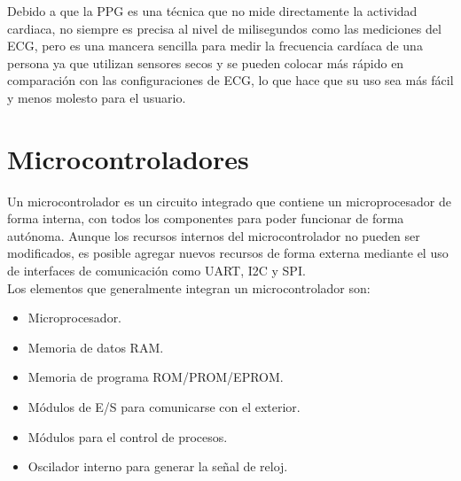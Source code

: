 			Debido a que la PPG es una técnica que no mide directamente la actividad cardiaca, no siempre es precisa al nivel de milisegundos como las mediciones del ECG, pero es una mancera sencilla para medir la frecuencia cardíaca de una persona ya que utilizan sensores secos y se pueden colocar más rápido en comparación con las configuraciones de ECG, lo que hace que su uso sea más fácil y menos molesto para el usuario. \cite{imotionsECG}
		
	\section{Microcontroladores}
	Un microcontrolador es  un  circuito  integrado  que  contiene  un  microprocesador  de  forma  interna,  con  todos  los  componentes  para  poder  funcionar  de  forma  autónoma. Aunque los recursos internos del microcontrolador no pueden ser modificados, es posible agregar nuevos recursos de forma externa mediante el uso de interfaces de comunicación como UART, I2C y SPI. \cite{garcia2017} \\
	
	Los  elementos  que  generalmente  integran  un  microcontrolador  son:
	\begin{itemize}
		\item Microprocesador.
		\item Memoria  de  datos  RAM.
		\item Memoria  de  programa  ROM/PROM/EPROM.
		\item Módulos  de  E/S  para  comunicarse  con  el  exterior.
		\item Módulos  para  el  control  de  procesos.
		\item Oscilador  interno  para  generar  la  señal  de  reloj.
	\end{itemize}

	